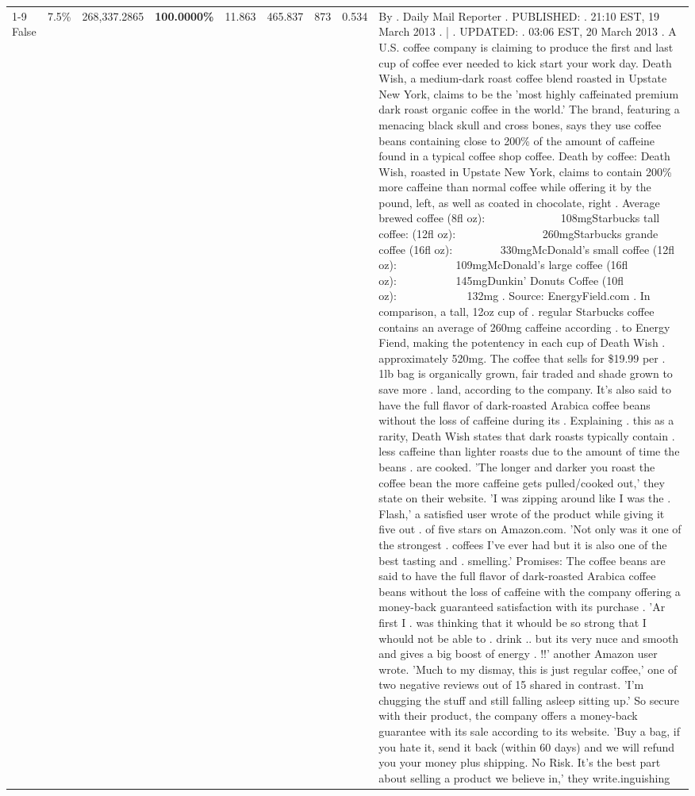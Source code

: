 \begin{table}[H]
{\begin{tabular}{lllrlllll}
\cline{1-9}
False & 7.5\% & \color{red} 268,337.2865 & \bfseries \color{red} 100.0000\% & 11.863 & 465.837 & 873 & 0.534 & By . Daily Mail Reporter . PUBLISHED: . 21:10 EST, 19 March 2013 . | . UPDATED: . 03:06 EST, 20 March 2013 . A U.S. coffee company is claiming to produce the first and last cup of coffee ever needed to kick start your work day. Death Wish, a medium-dark roast coffee blend roasted in Upstate New York, claims to be the 'most highly caffeinated premium dark roast organic coffee in the world.' The brand, featuring a menacing black skull and cross bones, says they use coffee beans containing close to 200\% of the amount of caffeine found in a typical coffee shop coffee. Death by coffee: Death Wish, roasted in Upstate New York, claims to contain 200\% more caffeine than normal coffee while offering it by the pound, left, as well as coated in chocolate, right . Average brewed coffee (8fl oz):              108mgStarbucks tall coffee: (12fl oz):                260mgStarbucks grande coffee (16fl oz):         330mgMcDonald's small coffee (12fl oz):           109mgMcDonald's large coffee (16fl oz):           145mgDunkin' Donuts Coffee (10fl oz):             132mg . Source: EnergyField.com . In comparison, a tall, 12oz cup of . regular Starbucks coffee contains an average of 260mg caffeine according . to Energy Fiend, making the potentency in each cup of Death Wish . approximately 520mg. The coffee that sells for \$19.99 per . 1lb bag is organically grown, fair traded and shade grown to save more . land, according to the company. It's also said to have the full flavor of dark-roasted Arabica coffee beans without the loss of caffeine during its . Explaining . this as a rarity, Death Wish states that dark roasts typically contain . less caffeine than lighter roasts due to the amount of time the beans . are cooked. 'The longer and darker you roast the coffee bean the more caffeine gets pulled/cooked out,' they state on their website. 'I was zipping around like I was the . Flash,' a satisfied user wrote of the product while giving it five out . of five stars on Amazon.com. 'Not only was it one of the strongest . coffees I've ever had but it is also one of the best tasting and . smelling.’ Promises: The coffee beans are said to have the full flavor of dark-roasted Arabica coffee beans without the loss of caffeine with the company offering a money-back guaranteed satisfaction with its purchase . 'Ar first I . was thinking that it whould be so strong that I whould not be able to . drink .. but its very nuce and smooth and gives a big boost of energy . !!' another Amazon user wrote. 'Much to my dismay, this is just regular coffee,' one of two negative reviews out of 15 shared in contrast. 'I'm chugging the stuff and still falling asleep sitting up.' So secure with their product, the company offers a money-back guarantee with its sale according to its website. 'Buy a bag, if you hate it, send it back (within 60 days) and we will refund you your money plus shipping. No Risk. It’s the best part about selling a product we believe in,' they write.inguishing \\

\end{tabular}}
\end{table}
